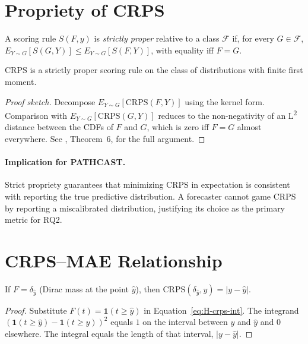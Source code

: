 \section{Propriety of CRPS}
\label{app:H-crps-proper}

\begin{definition}
A scoring rule $S(F, y)$ is \emph{strictly proper} relative to a class
$\mathcal{F}$ if, for every $G \in \mathcal{F}$,
$E_{Y \sim G}[S(G, Y)] \leq E_{Y \sim G}[S(F, Y)]$, with equality iff
$F = G$.
\end{definition}

\begin{theorem}
\label{thm:H-proper}
CRPS is a strictly proper scoring rule on the class of distributions with
finite first moment.
\end{theorem}

\begin{proof}[Proof sketch]
Decompose $E_{Y \sim G}[\mathrm{CRPS}(F, Y)]$ using the kernel form.
Comparison with $E_{Y \sim G}[\mathrm{CRPS}(G, Y)]$ reduces to the
non-negativity of an L\textsuperscript{2} distance between the CDFs of $F$
and $G$, which is zero iff $F = G$ almost everywhere. See
\cite{gneiting2007strictly}, Theorem~6, for the full argument.
\end{proof}

\paragraph{Implication for PATHCAST.} Strict propriety guarantees that
minimizing CRPS in expectation is consistent with reporting the true
predictive distribution. A forecaster cannot game CRPS by reporting a
miscalibrated distribution, justifying its choice as the primary metric
for RQ2.


\section{CRPS--MAE Relationship}
\label{app:H-crps-mae}

\begin{theorem}
\label{thm:H-mae}
If $F = \delta_{\hat{y}}$ (Dirac mass at the point $\hat{y}$), then
$\mathrm{CRPS}(\delta_{\hat{y}}, y) = |y - \hat{y}|$.
\end{theorem}

\begin{proof}
Substitute $F(t) = \mathbf{1}(t \geq \hat{y})$ in
Equation~\ref{eq:H-crps-int}. The integrand
$(\mathbf{1}(t \geq \hat{y}) - \mathbf{1}(t \geq y))^2$ equals $1$ on the
interval between $y$ and $\hat{y}$ and $0$ elsewhere. The integral equals
the length of that interval, $|y - \hat{y}|$.
\end{proof}


